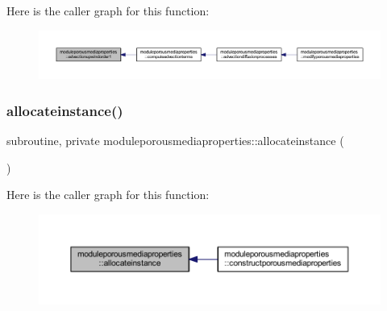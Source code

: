 Here is the caller graph for this function\+:\nopagebreak
\begin{figure}[H]
\begin{center}
\leavevmode
\includegraphics[width=350pt]{namespacemoduleporousmediaproperties_ab1e6a246ea1f6819438e21e75cf2de59_icgraph}
\end{center}
\end{figure}
\mbox{\label{namespacemoduleporousmediaproperties_aa100fa334641d2574c9b2965459d3dbf}} 
\subsubsection{\texorpdfstring{allocateinstance()}{allocateinstance()}}
{\footnotesize\ttfamily subroutine, private moduleporousmediaproperties\+::allocateinstance (\begin{DoxyParamCaption}{ }\end{DoxyParamCaption})\hspace{0.3cm}{\ttfamily [private]}}

Here is the caller graph for this function\+:\nopagebreak
\begin{figure}[H]
\begin{center}
\leavevmode
\includegraphics[width=350pt]{namespacemoduleporousmediaproperties_aa100fa334641d2574c9b2965459d3dbf_icgraph}
\end{center}
\end{figure}
\mbox{\label{namespacemoduleporousmediaproperties_a266292445f08da6a7567576e04444458}} 
